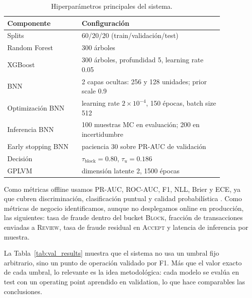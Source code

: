 \documentclass{article}
\begin{document}
\begin{table}[!htbp]
    \centering
    \small
    \caption{Hiperparámetros principales del sistema.}
    \label{tab:hyperparams}
    \begin{tabular}{p{0.30\linewidth}p{0.58\linewidth}}
        \toprule
        Componente         & Configuración                                              \\
        \midrule
        Splits             & 60/20/20 (train/validación/test)                           \\
        Random Forest      & 300 árboles                                                \\
        XGBoost            & 300 árboles, profundidad 5, learning rate 0.05             \\
        BNN                & 2 capas ocultas: 256 y 128 unidades; prior scale 0.9       \\
        Optimización BNN   & learning rate $2\times10^{-4}$, 150 épocas, batch size 512 \\
        Inferencia BNN     & 100 muestras MC en evaluación; 200 en incertidumbre        \\
        Early stopping BNN & paciencia 30 sobre PR-AUC de validación                    \\
        Decisión           & $\tau_{\mathrm{block}}=0.80$, $\tau_u=0.186$               \\
        GPLVM              & dimensión latente 2, 1500 épocas                           \\
        \bottomrule
    \end{tabular}
\end{table}

Como métricas offline usamos PR-AUC, ROC-AUC, F1, NLL, Brier y ECE, ya que cubren discriminación, clasificación puntual y calidad probabilística \citep{gneiting2007,niculescu2005,guo2017}. Como métricas de negocio identificamos, aunque no desplegamos online en producción, las siguientes: tasa de fraude dentro del bucket \textsc{Block}, fracción de transacciones enviadas a \textsc{Review}, tasa de fraude residual en \textsc{Accept} y latencia de inferencia por muestra.

La Tabla~\ref{tab:val_results} muestra que el sistema no usa un umbral fijo arbitrario, sino un punto de operación validado por F1. Más que el valor exacto de cada umbral, lo relevante es la idea metodológica: cada modelo se evalúa en test con un operating point aprendido en validation, lo que hace comparables las conclusiones.
\end{document}
